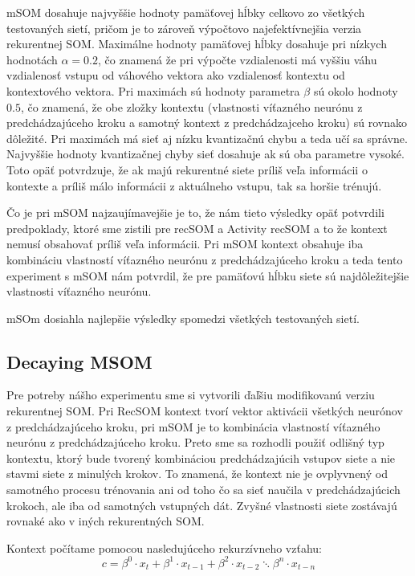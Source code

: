  mSOM dosahuje najvyššie hodnoty pamäťovej hĺbky celkovo zo všetkých testovaných sietí, pričom je to zároveň 
 výpočtovo najefektívnejšia verzia rekurentnej SOM. 
 Maximálne hodnoty pamäťovej hĺbky dosahuje pri nízkych hodnotách $\alpha = 0.2 $, čo znamená že pri výpočte vzdialenosti má vyššiu váhu vzdialenosť vstupu od 
 váhového vektora ako vzdialenosť kontextu od kontextového vektora. 
 Pri maximách sú hodnoty parametra $\beta$ sú okolo hodnoty $0.5$, čo znamená, že obe zložky kontextu 
 (vlastnosti víťazného neurónu z predchádzajúceho kroku a samotný kontext z predchádzajceho kroku) sú rovnako dôležité.
 Pri maximách má sieť aj nízku kvantizačnú chybu a teda učí sa správne. 
 Najvyššie hodnoty kvantizačnej chyby sieť dosahuje ak sú oba parametre vysoké. Toto opäť potvrdzuje, že ak majú rekurentné
 siete príliš veľa informácii o kontexte a príliš málo informácii z aktuálneho vstupu, tak sa horšie trénujú.


 Čo je pri mSOM najzaujímavejšie je to, že nám tieto výsledky opäť potvrdili predpoklady, ktoré sme zistili pre recSOM a Activity recSOM a to že
 kontext nemusí obsahovať príliš veľa informácii. Pri mSOM kontext obsahuje iba kombináciu vlastností víťazného neurónu z predchádzajúceho kroku a teda tento 
 experiment s mSOM nám potvrdil, že pre pamäťovú hĺbku siete sú najdôležitejšie vlastnosti víťazného neurónu.

 mSOm dosiahla najlepšie výsledky spomedzi všetkých testovaných sietí.



\subsection{Decaying MSOM}
Pre potreby nášho experimentu sme si vytvorili ďaľšiu modifikovanú verziu %
rekurentnej SOM. Pri RecSOM kontext tvorí vektor aktivácii všetkých neurónov z predchádzajúceho kroku, 
pri mSOM je to kombinácia vlastností víťazného neurónu z predchádzajúceho kroku. 
Preto sme sa rozhodli použiť odlišný typ kontextu, ktorý bude tvorený kombináciou predchádzajúcih vstupov 
siete a nie stavmi siete z minulých krokov. To znamená, že kontext nie je ovplyvnený od samotného procesu trénovania
ani od toho čo sa sieť naučila v predchádzajúcich krokoch, ale iba od samotných vstupných dát.
Zvyšné vlastnosti siete zostávajú rovnaké ako v iných rekurentných SOM.

Kontext počítame pomocou nasledujúceho rekurzívneho vzťahu:
\begin{equation}
	c = \beta^{0} \cdot x_{t} + \beta^{1} \cdot x_{t-1} + 
	\beta^{2} \cdot x_{t-2} \ddots \beta^{n} \cdot x_{t-n}
\end{equation}

